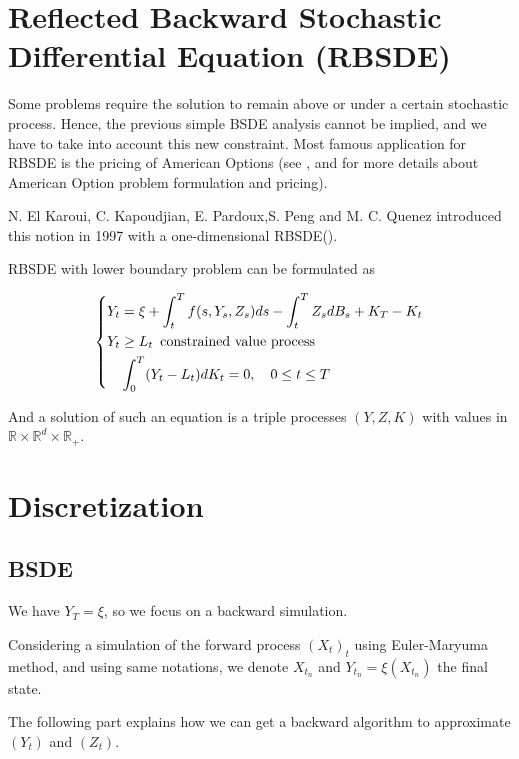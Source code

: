\documentclass[english,11pt,openany]{report}
\theoremstyle{definition}
\newcommand{\R}{\mathbb{R}}
\theoremstyle{plain}
\theoremstyle{definition}
\begin{document}
\section{Reflected Backward Stochastic Differential Equation (RBSDE)}

Some problems require the solution to remain above or under a certain stochastic process. Hence, the previous simple BSDE analysis cannot be implied, and we have to take into account this new constraint. 
Most famous application for RBSDE is the pricing of American Options (see \cite{warin:amoption}, \cite{rodgers:amoption} and \cite{glasserman:amoption} for more details about American Option problem formulation and pricing). 
 
N. El Karoui, C. Kapoudjian, E. Pardoux,S. Peng and M. C. Quenez introduced this notion in 1997 with a one-dimensional RBSDE(\cite{el1997reflected}). 

RBSDE with lower boundary problem can be formulated as 


\begin{equation}
\left\{
\begin{aligned}\label{eq:rbsde}
Y_t &= \xi + \int_{t}^{T}f(s, Y_s, Z_s)ds - \int_{t}^{T}Z_sdB_s + K_T - K_t\\
Y_t &\geq L_t \enskip \text{constrained value process}\\
&\int_{0}^{T}(Y_t - L_t)dK_t=0, \quad 0\leq t \leq T
\end{aligned}
\right.
\end{equation}

And a solution of such an equation is a triple processes $(Y, Z, K)$ with values in $\R \times \R^d \times \R_+$.   

\section{Discretization}

\subsection{BSDE}

We have $Y_T = \xi$, so we focus on a backward simulation. 

Considering a simulation of the forward process $(X_{t})_t$ using Euler-Maryuma method, and using same notations, we denote $X_{t_n}$ and $Y_{t_n} = \xi(X_{t_n})$ the final state.

The following part explains how we can get a backward algorithm to approximate $(Y_t)$ and $(Z_t)$. 
\end{document}
